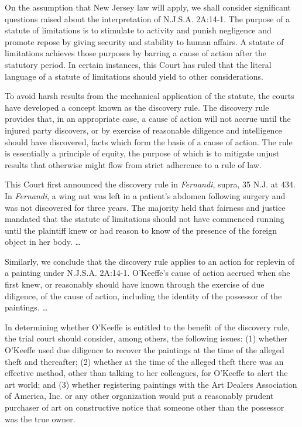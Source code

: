 
On the assumption that New Jersey law will apply, we shall consider significant
questions raised about the interpretation of N.J.S.A. 2A:14-1. The purpose of a
statute of limitations is to stimulate to activity and punish negligence and
promote repose by giving security and stability to human affairs. A statute of
limitations achieves those purposes by barring a cause of action after the
statutory period. In certain instances, this Court has ruled that the literal
language of a statute of limitations should yield to other considerations.

To avoid harsh results from the mechanical application of the statute, the
courts have developed a concept known as the discovery rule. The discovery rule
provides that, in an appropriate case, a cause of action will not accrue until
the injured party discovers, or by exercise of reasonable diligence and
intelligence should have discovered, facts which form the basis of a cause of
action. The rule is essentially a principle of equity, the purpose of which is
to mitigate unjust results that otherwise might flow from strict adherence to a
rule of law.

This Court first announced the discovery rule in \textit{Fernandi}, supra, 35
N.J. at 434. In \textit{Fernandi}, a wing nut was left in a patient's abdomen
following surgery and was not discovered for three years. The majority held
that fairness and justice mandated that the statute of limitations should not
have commenced running until the plaintiff knew or had reason to know of the
presence of the foreign object in her body. \ldots

Similarly, we conclude that the discovery rule applies to an action for replevin
of a painting under N.J.S.A. 2A:14-1. O'Keeffe's cause of action accrued when
she first knew, or reasonably should have known through the exercise of due
diligence, of the cause of action, including the identity of the possessor of
the paintings. \ldots

In determining whether O'Keeffe is entitled to the benefit of the discovery
rule, the trial court should consider, among others, the following issues: (1)
whether O'Keeffe used due diligence to recover the paintings at the time of the
alleged theft and thereafter; (2) whether at the time of the alleged theft
there was an effective method, other than talking to her colleagues, for
O'Keeffe to alert the art world; and (3) whether registering paintings with the
Art Dealers Association of America, Inc. or any other organization would put a
reasonably prudent purchaser of art on constructive notice that someone other
than the possessor was the true owner.


